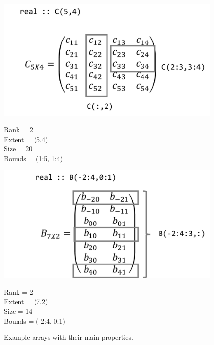 \newpage
\FloatBarrier
\begin{figure}[b]
    \centering
    \includegraphics[width = .8\textwidth]{./doc/Figures/Array1.png}  \\
    \begin{center}
        Rank = 2 \\
        Extent = (5,4) \\
        Size = 20 \\
        Bounds = (1:5, 1:4) \\
    \end{center}
\end{figure}

\begin{figure}[b]
    \centering
    \includegraphics[width = .8\textwidth]{./doc/Figures/Array3.png}  \\
    \begin{center}
        Rank = 2 \\
        Extent = (7,2) \\
        Size = 14 \\
        Bounds = (-2:4, 0:1) \\
    \end{center}
\caption{Example arrays with their main properties.}   \label{fig:arrays}
\end{figure}

